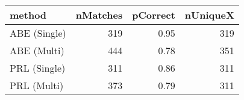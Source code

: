 \begin{tabular}{lrrr}
  \toprule
method & nMatches & pCorrect & nUniqueX \\ 
  \midrule
ABE (Single) & 319 & 0.95 & 319 \\ 
  ABE (Multi) & 444 & 0.78 & 351 \\ 
  PRL (Single) & 311 & 0.86 & 311 \\ 
  PRL (Multi) & 373 & 0.79 & 311 \\ 
   \bottomrule
\end{tabular}
